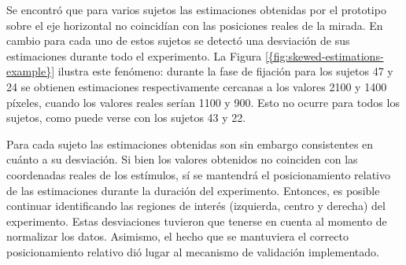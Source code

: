 Se encontró que para varios sujetos las estimaciones obtenidas por el prototipo
sobre el eje horizontal no coincidían con las posiciones reales de la mirada.
En cambio para cada uno de estos sujetos se detectó una desviación de sus
estimaciones durante todo el experimento.
La Figura \ref{{fig:skewed-estimations-example}} ilustra este fenómeno:
durante la fase de fijación para los sujetos 47 y 24 se obtienen estimaciones
respectivamente cercanas a los valores 2100 y 1400 píxeles, cuando los valores
reales serían 1100 y 900.
Esto no ocurre para todos los sujetos, como puede verse con los sujetos 43 y 22.

Para cada sujeto las estimaciones obtenidas son sin embargo consistentes en
cuánto a su desviación. Si bien los valores obtenidos no coinciden con las
coordenadas reales de los estímulos, sí se mantendrá el posicionamiento
relativo de las estimaciones durante la duración del experimento. Entonces, es
posible continuar identificando las regiones de interés (izquierda, centro y
derecha) del experimento. Estas desviaciones tuvieron que tenerse en cuenta al
momento de normalizar los datos. Asimismo, el hecho que se mantuviera el
correcto posicionamiento relativo dió lugar al mecanismo de validación
implementado.
